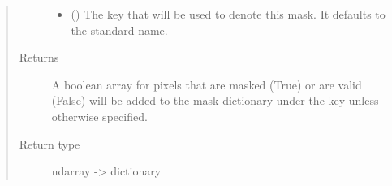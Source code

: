 \documentclass[letterpaper,10pt,english]{sphinxmanual}
\begin{document}
\begin{fulllineitems}
\begin{quote}
\begin{description}
\begin{itemize}
\item {} 
 (\sphinxstyleliteralemphasis{\sphinxupquote{ (}}\sphinxstyleliteralemphasis{\sphinxupquote{)}}) \textendash{} The key that will be used to denote this mask. It defaults to the
standard name.

\end{itemize}

\item[{Returns}] \leavevmode
{} \textendash{} A boolean array for pixels that are masked (True) or are valid
(False) will be added to the mask dictionary under the
key  unless otherwise specified.

\item[{Return type}] \leavevmode
ndarray -\textgreater{} dictionary

\end{description}\end{quote}

\end{fulllineitems}

\end{document}
